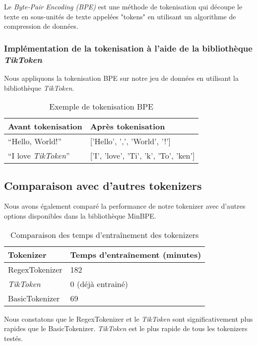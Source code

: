 Le \textit{Byte-Pair Encoding (BPE)} est une méthode de tokenisation qui découpe le texte en sous-unités de texte appelées "tokens" en utilisant un algorithme de compression de données.

\subsubsection*{Implémentation de la tokenisation à l'aide de la bibliothèque \textit{TikToken}}

Nous appliquons la tokenisation BPE sur notre jeu de données en utilisant la bibliothèque \textit{TikToken}.

\begin{table}[h]
\centering
\begin{tabular}{|l|l|}
\hline
\textbf{Avant tokenisation} & \textbf{Après tokenisation} \\ \hline
``Hello, World!'' & ['Hello', ',', 'World', '!'] \\ \hline
``I love \textit{TikToken}'' & ['I', 'love', 'Ti', 'k', 'To', 'ken'] \\ \hline
\end{tabular}
\caption{Exemple de tokenisation BPE}
\end{table}

\subsection{Comparaison avec d'autres tokenizers}

Nous avons également comparé la performance de notre tokenizer avec d'autres options disponibles dans la bibliothèque MinBPE.

\begin{table}[h]
\centering
\begin{tabular}{|l|l|}
\hline
\textbf{Tokenizer} & \textbf{Temps d'entraînement (minutes)} \\ \hline
RegexTokenizer & 182 \\ \hline
\textit{TikToken} & 0 (déjà entrainé) \\ \hline
BasicTokenizer & 69 \\ \hline
\end{tabular}
\caption{Comparaison des temps d'entraînement des tokenizers}
\end{table}


Nous constatons que le RegexTokenizer et le \textit{TikToken} sont significativement plus rapides que le BasicTokenizer. \textit{TikToken} est le plus rapide de tous les tokenizers testés.

